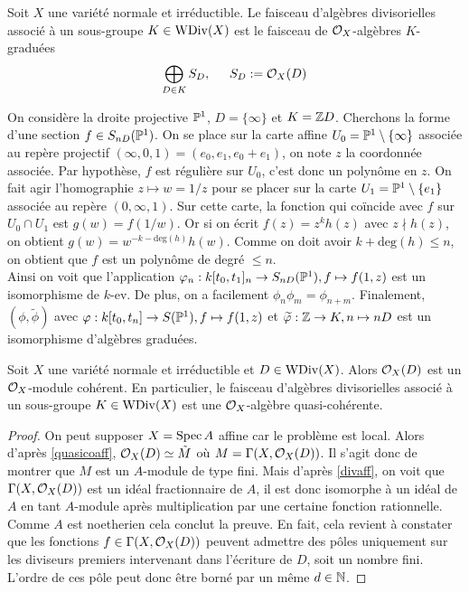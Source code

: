 \begin{defn}
Soit $X$ une variété normale et irréductible. Le faisceau d'algèbres divisorielles associé à un sous-groupe $K\in \operatorname{WDiv}(X)$ est le faisceau de $\mathcal{O}_X$-algèbres $K$-graduées $$\bigoplus_{D\in K}S_D,\,\,\,\,\,\,\,\,\, S_D:=\mathcal{O}_X(D)$$ 
\end{defn}


\begin{ex}
On considère la droite projective $\mathbb{P}^1$, $D=\lbrace\infty\rbrace$ et $K=\mathbb{Z} D$. Cherchons la forme d'une section $f\in S_{nD}(\mathbb{P}^1)$. On se place sur la carte affine $U_0=\mathbb{P}^1\setminus \lbrace \infty\rbrace$ associée au repère projectif $(\infty, 0, 1)=(e_0,e_1,e_0+e_1)$, on note $z$ la coordonnée associée. Par hypothèse, $f$ est régulière sur $U_0$, c'est donc un polynôme en $z$. On fait agir l'homographie $z\mapsto w=1/z$  pour se placer sur la carte $U_1=\mathbb{P}^1\setminus \lbrace e_1 \rbrace$ associée au repère $(0, \infty,1)$. Sur cette carte, la fonction qui coïncide avec $f$ sur $U_0\cap U_1$ est $g(w)=f(1/w)$. Or si on écrit $f(z)=z^kh(z)$ avec $z\nmid h(z)$, on obtient $g(w)=w^{-k-\textrm{deg}(h)}h(w)$. Comme on doit avoir $k+\textrm{deg}(h)\leq n$, on obtient que $f$ est un polynôme de degré $\leq n$.\\
Ainsi on voit que l'application $\varphi_n:k[t_0,t_1]_n\rightarrow S_{nD}(\mathbb{P}^1), f\mapsto f(1,z)$ est un isomorphisme de $k$-ev. De plus, on a facilement $\phi_n\phi_m=\phi_{n+m}$. Finalement, $(\phi, \widetilde{\phi})$ avec $\varphi: k[t_0,t_n]\rightarrow S(\mathbb{P}^1), f\mapsto f(1,z)$ et $\widetilde{\varphi}:\mathbb{Z}\rightarrow K, n\mapsto nD$ est un isomorphisme d'algèbres graduées.
\end{ex}

\begin{prop}
Soit $X$ une variété normale et irréductible et $D\in\operatorname{WDiv}(X)$. Alors $\mathcal{O}_X(D)$ est un $\mathcal{O}_X$-module cohérent. En particulier, le faisceau d'algèbres divisorielles associé à un sous-groupe $K\in \operatorname{WDiv}(X)$ est une $\mathcal{O}_X$-algèbre quasi-cohérente.
\end{prop}
\begin{proof}
On peut supposer $X=\operatorname{Spec} A$ affine car le problème est local.  Alors d'après \ref{quasicoaff}, $\mathcal{O}_X(D)\simeq \tilde{M}$ où $M=\Gamma(X,\mathcal{O}_X(D))$. Il s'agit donc de montrer que $M$ est un $A$-module de type fini. Mais d'après \ref{divaff}, on voit que $\Gamma(X,\mathcal{O}_X(D))$ est un idéal fractionnaire de $A$, il est donc isomorphe à un idéal de $A$ en tant $A$-module après multiplication par une certaine fonction rationnelle. Comme $A$ est noetherien cela conclut la preuve. En fait, cela revient à constater que les fonctions $f\in \Gamma(X,\mathcal{O}_X(D))$ peuvent admettre des pôles uniquement sur les diviseurs premiers intervenant dans l'écriture de $D$, soit un nombre fini. L'ordre de ces pôle peut  donc être borné par un même $d\in \mathbb{N}$.
\end{proof}

